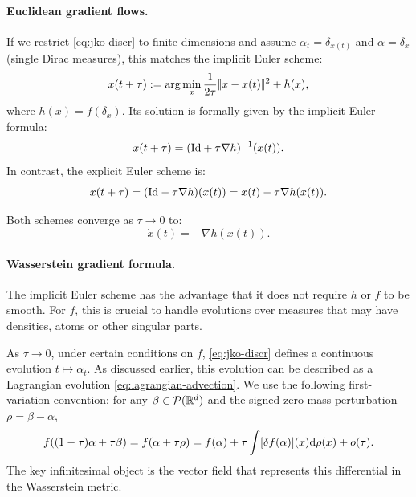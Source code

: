 \paragraph{Euclidean gradient flows.}

If we restrict \eqref{eq:jko-discr} to finite dimensions and assume $\alpha_t = \delta_{x(t)}$ and $\alpha = \delta_x$ (single Dirac measures), this matches the implicit Euler scheme:
\begin{equation*}
    x(t+\tau) := \arg\min_x \frac{1}{2 \tau} |\!| x - x(t) |\!|^2 + h(x),
\end{equation*}
where $h(x) = f(\delta_x)$. Its solution is formally given by the implicit Euler formula:
\begin{equation*}
    x(t+\tau) = (\mathrm{Id} + \tau \nabla h)^{-1}(x(t)).
\end{equation*}
In contrast, the explicit Euler scheme is:
\begin{equation*}
    x(t+\tau) = (\mathrm{Id} - \tau \nabla h)(x(t)) = x(t) - \tau \nabla h(x(t)).
\end{equation*}

Both schemes converge as $\tau \to 0$ to:
\begin{equation}
    \dot{x}(t) = -\nabla h(x(t)). \label{eq:grad-flow-classical}
\end{equation}


\paragraph{Wasserstein gradient formula.}

The implicit Euler scheme has the advantage that it does not require $h$ or $f$ to be smooth. For $f$, this is crucial to handle evolutions over measures that may have densities, atoms or other singular parts.

As $\tau \to 0$, under certain conditions on $f$, \eqref{eq:jko-discr} defines a continuous evolution $t \mapsto \alpha_t$. As discussed earlier, this evolution can be described as a Lagrangian evolution \eqref{eq:lagrangian-advection}. We use the following first-variation convention: for any $\beta\in\mathcal{P}(\mathbb{R}^d)$ and the signed zero-mass perturbation $\rho=\beta-\alpha$,
\begin{equation*}
    f((1-\tau)\alpha + \tau \beta) = f(\alpha + \tau \rho) = f(\alpha) + \tau \int [\delta f(\alpha)](x) \mathrm{d} \rho(x) + o(\tau).
\end{equation*}
The key infinitesimal object is the vector field that represents this differential in the Wasserstein metric.


